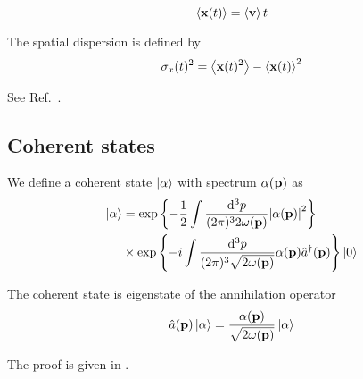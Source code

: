\begin{example}
	\begin{equation}
		\expval{\vb{x}(t)}
		=
		\expval{\vb{v}}t
	\end{equation}	
\end{example}
\begin{definition}
	The spatial dispersion is defined by
	\begin{equation}
		\sigma_x(t)^2
		=
		\expval{\vb{x}(t)^2}
		-
		\expval{\vb{x}(t)}^2		
	\end{equation}
\end{definition}
\begin{example}
	See Ref.~\cite{Naumov2013}.
\end{example}

\subsection{Coherent states}

\begin{definition}
	We define a coherent state $\ket{\alpha}$ with spectrum $\alpha(\vb{p})$ as
	\begin{equation}
		\begin{split}
			\ket{\alpha}
			&=
			\exp\left\{
				-
				\frac{1}{2}
				\int\frac{\dd[3]{p}}{(2\pi)^32\omega(\vb{p})}
				\abs{\alpha(\vb{p})}^2
			\right\}
			\\
			&\times
			\exp\left\{
				-i
				\int\frac{\dd[3]{p}}{(2\pi)^3\sqrt{2\omega(\vb{p})}}
				\alpha(\vb{p})
				\hat{a}^\dagger(\vb{p})
			\right\}
			\ket{0}
		\end{split}
	\end{equation}
\end{definition}
\begin{theorem}\label{thm:coherent_state_annihilation_eigenvalue}
	The coherent state is eigenstate of the annihilation operator
	\begin{equation}
		\hat{a}(\vb{p})
		\ket{\alpha}
		=
		\frac{\alpha(\vb{p})}{\sqrt{2\omega(\vb{p})}}
		\ket{\alpha}
	\end{equation}
\end{theorem}
The proof is given in .

